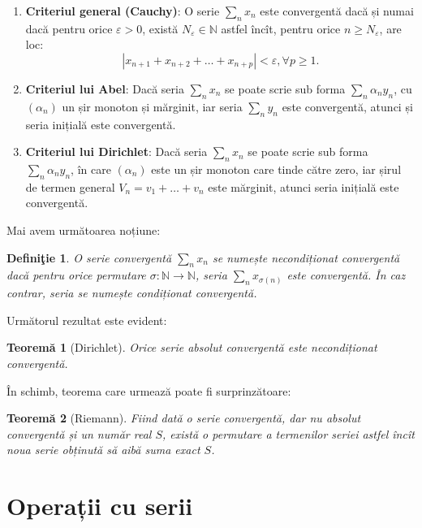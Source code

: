 \documentclass[11pt,a4paper]{article}
\newcommand\NN{\mathbb{N}}
\theoremstyle{dotless}
\newtheorem{theorem}{Teorem\u{a}}[section]
\theoremstyle{dotlessdr}
\newtheorem{definition}{Defini\c{t}ie}[section]
\begin{document}
\begin{enumerate}[(1)]
  \item \textbf{Criteriul general (Cauchy)}: O serie $\sum_n x_n$ este convergentă
    dacă și numai dacă pentru orice $\varepsilon > 0$, există $N_\varepsilon \in \NN$
    astfel încît, pentru orice $n \geq N_\varepsilon$, are loc:
    \[
      |x_{n+1} + x_{n+2} + \dots + x_{n + p} | < \varepsilon, \forall p \geq 1.
    \]
    
  \item \textbf{Criteriul lui Abel}: Dacă seria $\sum_n x_n$ se poate scrie sub forma
    $\sum_n \alpha_n y_n$, cu $(\alpha_n)$ un șir monoton și mărginit, iar seria
    $\sum_n y_n$ este convergentă, atunci și seria inițială este convergentă.

  \item \textbf{Criteriul lui Dirichlet}: Dacă seria $\sum_n x_n$ se poate scrie
    sub forma $\sum_n \alpha_n y_n$, în care $(\alpha_n)$ este un șir monoton care
    tinde către zero, iar șirul de termen general $V_n = v_1 + \dots + v_n$ este
    mărginit, atunci seria inițială este convergentă.
\end{enumerate}

Mai avem următoarea noțiune:
\begin{definition}\label{def:conv-cond}
  O serie convergentă $\sum_n x_n$ se numește \emph{necondiționat convergentă} dacă
  pentru orice permutare $\sigma : \NN \to \NN$, seria $\sum_n x_{\sigma(n)}$ este
  convergentă. În caz contrar, seria se numește \emph{condiționat convergentă}.
\end{definition}

Următorul rezultat este evident:
\begin{theorem}[Dirichlet]\label{thm:abs-necond}
  Orice serie absolut convergentă este necondiționat convergentă.
\end{theorem}

În schimb, teorema care urmează poate fi surprinzătoare:
\begin{theorem}[Riemann]\label{thm:riemann-reord}
  Fiind dată o serie convergentă, dar nu absolut convergentă și un număr real $S$,
  există o permutare a termenilor seriei astfel încît noua serie obținută să aibă
  suma exact $S$.
\end{theorem}


\section{Operații cu serii}
\end{document}
